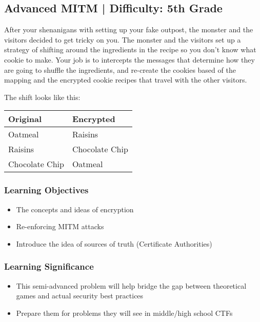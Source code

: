 \documentclass{article}
\begin{document}
\pagebreak

\subsection{Advanced MITM | Difficulty: 5th Grade}

After your shenanigans with setting up your fake outpost, the monster
and the visitors decided to get tricky on you. The monster and the
visitors set up a strategy of shifting around the ingredients in the
recipe so you don't know what cookie to make. Your job is to
intercepts the messages that determine how they are going to shuffle
the ingredients, and re-create the cookies based of the mapping and
the encrypted cookie recipes that travel with the other visitors.

The shift looks like
this: %
\begin{table}[h]
\centering
\begin{tabular}{l|l}
\textbf{Original}       & \textbf{Encrypted}      \\ \hline
Oatmeal        & Raisins        \\ \hline
Raisins        & Chocolate Chip \\ \hline
Chocolate Chip & Oatmeal        \\
\end{tabular}
\end{table}

\subsubsection{Learning Objectives}

\begin{itemize}
  \item The concepts and ideas of encryption
  \item Re-enforcing MITM attacks
  \item Introduce the idea of sources of truth (Certificate
    Authorities)
\end{itemize}

\subsubsection{Learning Significance}

\begin{itemize}
  \item This semi-advanced problem will help bridge the gap between
    theoretical games and actual security best practices
  \item Prepare them for problems they will see in middle/high school CTFs
\end{itemize}
\end{document}
